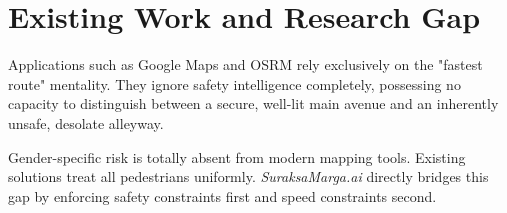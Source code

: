 \section{Existing Work and Research Gap}
Applications such as Google Maps and OSRM rely exclusively on the "fastest route" mentality. They ignore safety intelligence completely, possessing no capacity to distinguish between a secure, well-lit main avenue and an inherently unsafe, desolate alleyway. 

Gender-specific risk is totally absent from modern mapping tools. Existing solutions treat all pedestrians uniformly. \textit{SuraksaMarga.ai} directly bridges this gap by enforcing safety constraints first and speed constraints second.
